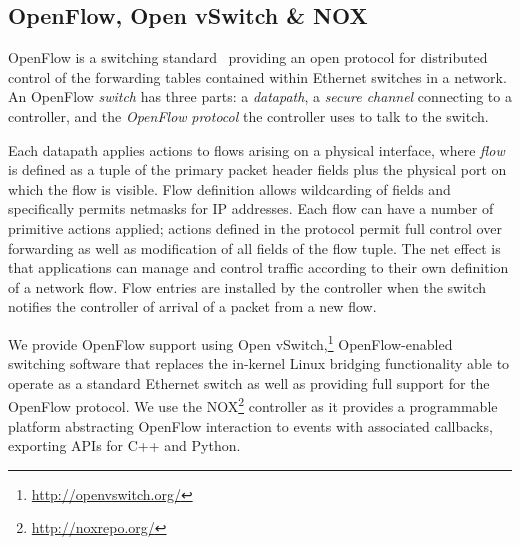 \subsection{OpenFlow, Open vSwitch \& NOX} \label{s:openflow}

 
OpenFlow is a switching standard~\cite{mckeown:_openf} providing an open
protocol for distributed control of the forwarding tables contained within
Ethernet switches in a network.  An OpenFlow \emph{switch} has three parts: a
\emph{datapath}, a \emph{secure channel} connecting to a controller, and the
\emph{OpenFlow} \emph{protocol} the controller uses to talk to the switch.  

Each datapath applies actions to flows arising on a physical interface, where
\emph{flow} is defined as a tuple of the primary packet header fields plus the
physical port on which the flow is visible.  Flow definition allows wildcarding
of fields and specifically permits netmasks for IP addresses.  Each flow can
have a number of primitive actions applied; actions defined in the protocol
permit full control over forwarding as well as modification of all fields of the
flow tuple.  The net effect is that applications can manage and control traffic
according to their own definition of a network flow.  Flow entries are installed
by the controller when the switch notifies the controller of arrival of  a
packet from a new flow.

We provide OpenFlow support using Open
vSwitch,\footnote{\url{http://openvswitch.org/}} OpenFlow-enabled switching
software that replaces the in-kernel Linux bridging functionality able to
operate as a standard Ethernet switch as well as providing full support for the
OpenFlow protocol.  We use the NOX\footnote{\url{http://noxrepo.org/}}
controller as it provides a programmable platform abstracting OpenFlow
interaction to events with associated callbacks, exporting APIs for C++ and
Python.



